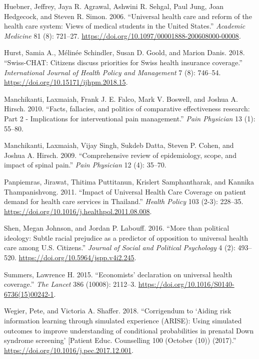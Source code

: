 \documentclass[
]{article}
\begin{document}
\leavevmode\hypertarget{ref-Huebner2006}{}%
Huebner, Jeffrey, Jaya R. Agrawal, Ashwini R. Sehgal, Paul Jung, Joan
Hedgecock, and Steven R. Simon. 2006. ``Universal health care and reform
of the health care system: Views of medical students in the United
States.'' \emph{Academic Medicine} 81 (8): 721--27.
\url{https://doi.org/10.1097/00001888-200608000-00008}.

\leavevmode\hypertarget{ref-Hurst2018}{}%
Hurst, Samia A., Mélinée Schindler, Susan D. Goold, and Marion Danis.
2018. ``Swiss-CHAT: Citizens discuss priorities for Swiss health
insurance coverage.'' \emph{International Journal of Health Policy and
Management} 7 (8): 746--54.
\url{https://doi.org/10.15171/ijhpm.2018.15}.

\leavevmode\hypertarget{ref-Manchikanti2010}{}%
Manchikanti, Laxmaiah, Frank J. E. Falco, Mark V. Boswell, and Joshua A.
Hirsch. 2010. ``Facts, fallacies, and politics of comparative
effectiveness research: Part 2 - Implications for interventional pain
management.'' \emph{Pain Physician} 13 (1): 55--80.

\leavevmode\hypertarget{ref-Manchikanti2009}{}%
Manchikanti, Laxmaiah, Vijay Singh, Sukdeb Datta, Steven P. Cohen, and
Joshua A. Hirsch. 2009. ``Comprehensive review of epidemiology, scope,
and impact of spinal pain.'' \emph{Pain Physician} 12 (4): 35--70.

\leavevmode\hypertarget{ref-Panpiemras2011}{}%
Panpiemras, Jirawat, Thitima Puttitanun, Krislert Samphantharak, and
Kannika Thampanishvong. 2011. ``Impact of Universal Health Care Coverage
on patient demand for health care services in Thailand.'' \emph{Health
Policy} 103 (2-3): 228--35.
\url{https://doi.org/10.1016/j.healthpol.2011.08.008}.

\leavevmode\hypertarget{ref-Shen2016}{}%
Shen, Megan Johnson, and Jordan P. Labouff. 2016. ``More than political
ideology: Subtle racial prejudice as a predictor of opposition to
universal health care among U.S. Citizens.'' \emph{Journal of Social and
Political Psychology} 4 (2): 493--520.
\url{https://doi.org/10.5964/jspp.v4i2.245}.

\leavevmode\hypertarget{ref-Summers2015}{}%
Summers, Lawrence H. 2015. ``Economists' declaration on universal health
coverage.'' \emph{The Lancet} 386 (10008): 2112--3.
\url{https://doi.org/10.1016/S0140-6736(15)00242-1}.

\leavevmode\hypertarget{ref-Wegier2019}{}%
Wegier, Pete, and Victoria A. Shaffer. 2018. ``Corrigendum to `Aiding
risk information learning through simulated experience (ARISE): Using
simulated outcomes to improve understanding of conditional probabilities
in prenatal Down syndrome screening' {[}Patient Educ. Counselling 100
(October (10)) (2017).''
\url{https://doi.org/10.1016/j.pec.2017.12.001}.
\end{document}
